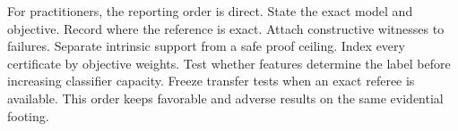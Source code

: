 For practitioners, the reporting order is direct.  State the exact model and objective.  Record where the reference is exact.  Attach constructive witnesses to failures.  Separate intrinsic support from a safe proof ceiling.  Index every certificate by objective weights.  Test whether features determine the label before increasing classifier capacity.  Freeze transfer tests when an exact referee is available.  This order keeps favorable and adverse results on the same evidential footing.
